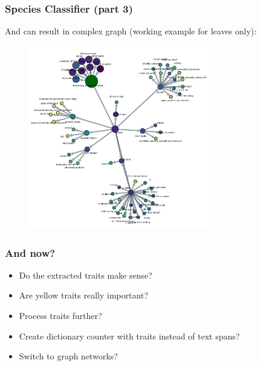 \documentclass{beamer}
\begin{document}
\begin{frame}
\frametitle{Species Classifier (part 3)}
And can result in complex graph (working example for leaves only):
\begin{figure} [htbp]
    \centering
    \includegraphics[width=0.7\textwidth, height=0.8\paperheight]{figures/plantnet_workingexample.pdf}
\end{figure}
\end{frame}


\begin{frame}
\frametitle{And now?}
\begin{itemize}
    \item Do the extracted traits make sense?
    \item Are yellow traits really important?
    \item Process traits further?
    \item Create dictionary counter with traits instead of text spans?
   \item Switch to graph networks?
\end{itemize}
\end{frame}
\end{document}
